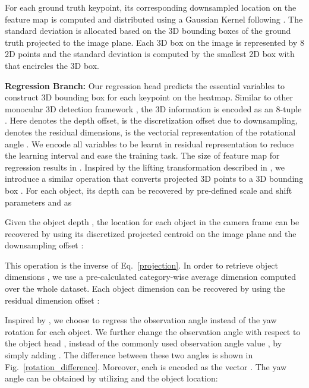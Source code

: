 \documentclass[10pt,twocolumn,letterpaper]{article}
\renewcommand{\paragraph}[1]{

        \vspace{3pt}
	\noindent\textbf{#1}}
\begin{document}
    

    For each ground truth keypoint, its corresponding downsampled location on the feature map is computed and distributed using a Gaussian Kernel following \cite{centernet_2019}. The standard deviation is allocated based on the 3D bounding boxes of the ground truth projected to the image plane. Each 3D box on the image is represented by 8 2D points  and the standard deviation is computed by the smallest 2D box with  that encircles the 3D box.
    
    \paragraph{Regression Branch:} 
    Our regression head predicts the essential variables to construct 3D bounding box for each keypoint on the heatmap. Similar to other monocular 3D detection framework \cite{roi10d_2019, monodis_2019}, the 3D information is encoded as an 8-tuple  . Here  denotes the depth offset,  is the discretization offset due to downsampling,  denotes the residual dimensions,  is the vectorial representation of the rotational angle . We encode all variables to be learnt in residual representation to reduce the learning interval and ease the training task. The size of feature map for regression results in . Inspired by the lifting transformation described in \cite{roi10d_2019}, we introduce a similar operation  that converts projected 3D points to a 3D bounding box . For each object, its depth  can be recovered by pre-defined scale and shift parameters  and  as
    
    Given the object depth , the location for each object in the camera frame can be recovered by using its discretized projected centroid  on the image plane and the downsampling offset : 
    
    This operation is the inverse of Eq.~\eqref{projection}.
    In order to retrieve object dimensions , we use a pre-calculated category-wise average dimension  computed over the whole dataset. Each object dimension can be recovered by using the residual dimension offset :

    
    Inspired by \cite{deep3dbox_2017}, we choose to regress the observation angle  instead of the yaw rotation  for each object. We further change the observation angle with respect to the object head , instead of the commonly used observation angle value , by simply adding . The difference between these two angles is shown in Fig.~\ref{rotation_difference}. Moreover, each  is encoded as the vector . The yaw angle  can be obtained by utilizing  and the object location:
    
\end{document}
